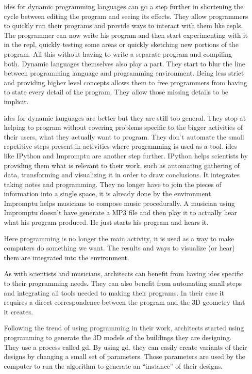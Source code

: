 \documentclass{./llncs2e/llncs}
\begin{document}
	\ac{ide}s for dynamic programming languages can go a step further in shortening the cycle between editing the program and seeing its effects.
	They allow programmers to quickly run their programs and provide ways to interact with them like \ac{repl}s.
	The programmer can now write his program and then start experimenting with it in the \ac{repl}, quickly testing some areas or quickly sketching new portions of the program.
	All this without having to write a separate program and compiling both.
	Dynamic languages themselves also play a part.
	They start to blur the line between programming language and programming environment.
	Being less strict and providing higher level concepts allows them to free programmers from having to state every detail of the program.
	They allow those missing details to be implicit.

	\ac{ide}s for dynamic languages are better but they are still too general.
	They stop at helping to program without covering problems specific to the bigger activities of their users, what they actually want to program.
	They don't automate the small repetitive steps present in activities where programming is used as a tool.
	\ac{ide}s like IPython and Impromptu are another step further.
	IPython helps scientists by providing them what is relevant to their work, such as automating gathering of data, transforming and visualizing it in order to draw conclusions.
	It integrates taking notes and programming.
	They no longer have to join the pieces of information into a single space, it is already done by the environment.
	Impromptu helps musicians to compose music procedurally.
	A musician using Impromptu doesn't have generate a MP3 file and then play it to actually hear what his program produced.
	He just starts his program and hears it.

	Here programming is no longer the main activity, it is used as a way to make computers do something we want.
	The results and ways to visualize (or hear) them are integrated into the environment.

	As with scientists and musicians, architects can benefit from having \ac{ide}s specific to their programming needs.
	They can also benefit from automating small steps and integrating all tools needed to making their programs.
	In their case it requires a direct correspondence between the program and the 3D geometry that it creates.
	
	Following the trend of using programming in their work, architects started using programming to generate the 3D models of the buildings they are designing. 
	They use a process called \ac{gd}\cite{terzidis2003expressive,Maeda:2001:DN:559503}.
	By using \ac{gd}, they can easily create variants of their designs by changing a small set of parameters. 
	Those parameters are used by the computer to run the algorithm to generate an ``instance'' of their designs. \cite{Santos20144}
\end{document}
